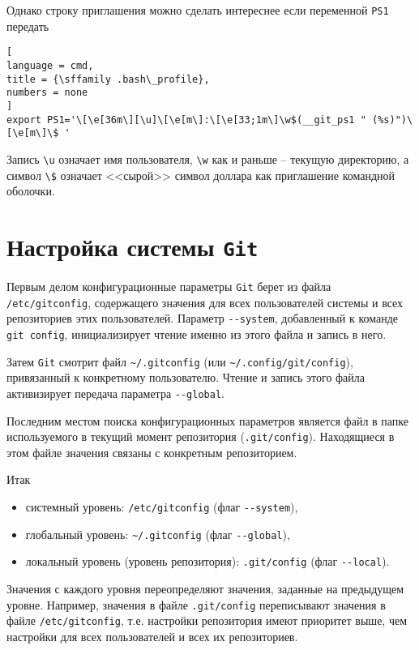 \documentclass[%
	11pt,
	a4paper,
	utf8,
		]{article}
\begin{document}
Однако строку приглашения можно сделать интереснее если переменной \texttt{PS1} передать
\begin{lstlisting}[
language = cmd,
title = {\sffamily .bash\_profile},
numbers = none
]
export PS1='\[\e[36m\][\u]\[\e[m\]:\[\e[33;1m\]\w$(__git_ps1 " (%s)")\[\e[m\]\$ '
\end{lstlisting}

Запись \verb|\u| означает имя пользователя, \verb|\w| как и раньше -- текущую директорию, а символ \verb|\$| означает <<сырой>> символ доллара как приглашение командной оболочки.

\section{Настройка системы \texttt{Git}}

Первым делом конфигурационные параметры \texttt{Git} берет из файла \texttt{/etc/gitconfig}, содержащего значения для всех пользователей системы и всех репозиториев этих пользователей. Параметр \verb|--system|, добавленный к команде \texttt{git config}, инициализирует чтение именно из этого файла и запись в него.

Затем \texttt{Git} смотрит файл \verb|~/.gitconfig| (или \verb|~/.config/git/config|), привязанный к конкретному пользователю. Чтение и запись этого файла активизирует передача параметра \verb|--global|.

Последним местом поиска конфигурационных параметров является файл в папке используемого в текущий момент репозитория (\verb|.git/config|). Находящиеся в этом файле значения связаны с конкретным репозиторием.

Итак
\begin{itemize}
	\item системный уровень: \verb|/etc/gitconfig| (флаг \verb|--system|),
	
	\item глобальный уровень: \verb|~/.gitconfig| (флаг \verb|--global|),
	
	\item локальный уровень (уровень репозитория): \verb|.git/config| (флаг \verb|--local|).
\end{itemize}

Значения с каждого уровня переопределяют значения, заданные на предыдущем уровне. Например, значения в файле \verb|.git/config| переписывают значения в файле \verb|/etc/gitconfig|, т.е. настройки репозитория имеют приоритет выше, чем настройки для всех пользователей и всех их репозиториев.
\end{document}
